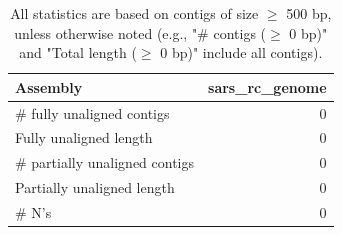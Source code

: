 \documentclass[12pt,a4paper]{article}
\begin{document}
\begin{table}[ht]
\begin{center}
\caption{All statistics are based on contigs of size $\geq$ 500 bp, unless otherwise noted (e.g., "\# contigs ($\geq$ 0 bp)" and "Total length ($\geq$ 0 bp)" include all contigs).}
\begin{tabular}{|l*{1}{|r}|}
\hline
Assembly & sars\_rc\_genome \\ \hline
\# fully unaligned contigs & 0 \\ \hline
Fully unaligned length & 0 \\ \hline
\# partially unaligned contigs & 0 \\ \hline
Partially unaligned length & 0 \\ \hline
\# N's & 0 \\ \hline
\end{tabular}
\end{center}
\end{table}
\end{document}
